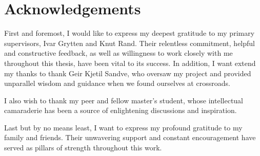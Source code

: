 \section*{Acknowledgements}
First and foremost, I would like to express my deepest gratitude to my primary supervisors, Ivar Grytten and Knut Rand.
Their relentless commitment, helpful and constructive feedback, as well as willingness to work closely with me throughout this thesis, have been vital to its success.
In addition, I want extend my thanks to thank Geir Kjetil Sandve, who oversaw my project and provided unparallel wisdom and guidance when we found ourselves at crossroads.

I also wish to thank my peer and fellow master's student, whose intellectual camaraderie has been a source of enlightening discussions and inspiration.

Last but by no means least, I want to express my profound gratitude to my family and friends. Their unwavering support and constant encouragement have served as pillars of strength throughout this work.
